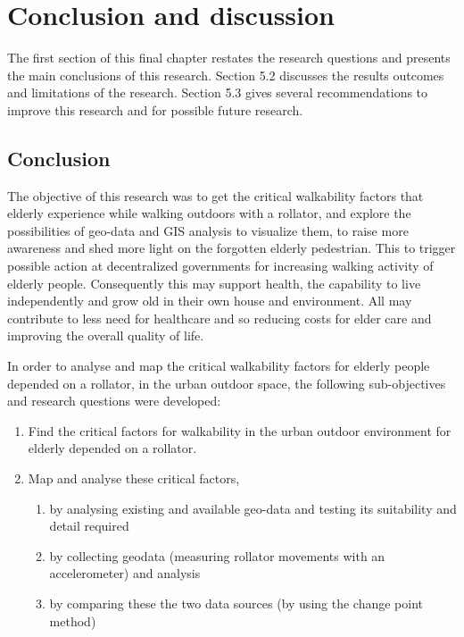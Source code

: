 \chapter{Conclusion and discussion} 
The first section of this final chapter restates the research questions and presents the main conclusions of this research. Section 5.2 discusses the results outcomes and limitations of the research. Section 5.3 gives several recommendations to improve this research and for possible future research.

\section{Conclusion} %
The objective of this research was to get the critical walkability factors that elderly experience while walking outdoors with a rollator, and explore the possibilities of geo-data and GIS analysis to visualize them, to raise more awareness and shed more light on the forgotten elderly pedestrian. This to trigger possible action at decentralized governments for increasing walking activity of elderly people. Consequently this may support health, the capability to live independently and grow old in their own house and environment. All may contribute to less need for healthcare and so reducing costs for elder care and improving the overall quality of life. 

In order to analyse and map the critical walkability factors for elderly people depended on a rollator, in the urban outdoor space, the following sub-objectives and research questions were developed:
\begin{enumerate}
\item Find the critical factors for walkability in the urban outdoor environment for elderly depended on a rollator.
\item Map and analyse these critical factors, 
 \begin{enumerate}
 	\item by analysing existing and available geo-data and testing its suitability and detail required
 	\item by collecting geodata (measuring rollator movements with an accelerometer) and analysis
 	\item by comparing these the two data sources (by using the change point method) 
 \end{enumerate}
\end{enumerate}

